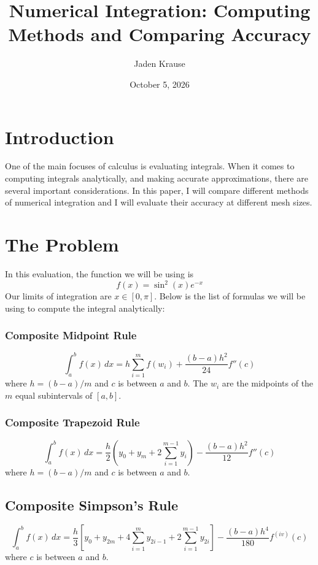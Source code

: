 \documentclass{article}
\title{Numerical Integration: Computing Methods and Comparing Accuracy}
\author{Jaden Krause}
\date{October 5, 2026}
\begin{document}
\maketitle

\section{Introduction}
One of the main focuses of calculus is evaluating integrals. When it comes to computing integrals analytically, 
and making accurate approximations, there are several important considerations. In this paper, I will compare 
different methods of numerical integration and I will evaluate their accuracy at different mesh sizes.

\section{The Problem}
In this evaluation, the function we will be using is
\[
    f(x) = \sin^2(x)e^{-x}
\]
Our limits of integration are $x \in [0, \pi]$. Below is the list of formulas we will be using to compute the integral analytically:
\subsubsection*{Composite Midpoint Rule}
\begin{equation}
\int_{a}^{b} f(x) \,dx = h \sum_{i=1}^{m} f(w_i) + \frac{(b-a)h^2}{24} f''(c)
\end{equation}
where $h = (b - a)/m$ and $c$ is between $a$ and $b$. The $w_i$ are the midpoints of the $m$
equal subintervals of $[a,b]$.
\subsubsection*{Composite Trapezoid Rule}
\begin{equation}
\int_{a}^{b} f(x) \, dx = \frac{h}{2} \left( y_0 + y_m + 2 \sum_{i=1}^{m-1} y_i \right) - \frac{(b-a)h^2}{12} f''(c)
\end{equation}
where $h = (b - a)/m$ and $c$ is between $a$ and $b$.
\subsection*{Composite Simpson's Rule}
\begin{equation}
\int_{a}^{b} f(x) \, dx = \frac{h}{3} \left[ y_0 + y_{2m} + 4 \sum_{i=1}^{m} y_{2i-1} + 2 \sum_{i=1}^{m-1} y_{2i} \right] - \frac{(b-a)h^4}{180} f^{(iv)}(c)
\end{equation}
where $c$ is between $a$ and $b$.
\end{document}
